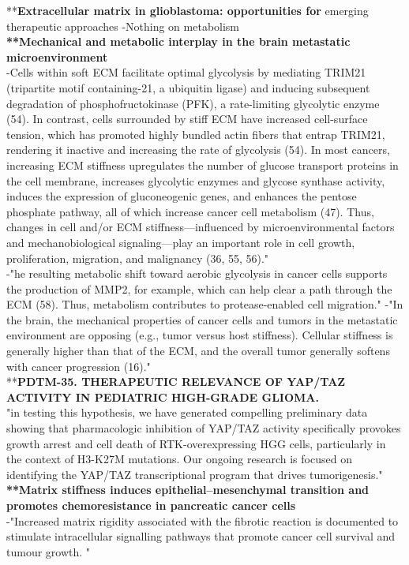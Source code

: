 \documentclass[11pt,a4paper]{article}
\begin{document}
**\textbf{Extracellular matrix in glioblastoma: opportunities for} emerging therapeutic approaches
-Nothing on metabolism\\


\textbf{
**Mechanical and metabolic interplay in the brain metastatic microenvironment}\\

-Cells within soft ECM facilitate optimal glycolysis by mediating TRIM21 (tripartite motif containing-21, a ubiquitin ligase) and inducing subsequent degradation of phosphofructokinase (PFK), a rate-limiting glycolytic enzyme (54). In contrast, cells surrounded by stiff ECM have increased cell-surface tension, which has promoted highly bundled actin fibers that entrap TRIM21, rendering it inactive and increasing the rate of glycolysis (54). In most cancers, increasing ECM stiffness upregulates the number of glucose transport proteins in the cell membrane, increases glycolytic enzymes and glycose synthase activity, induces the expression of gluconeogenic genes, and enhances the pentose phosphate pathway, all of which increase cancer cell metabolism (47). Thus, changes in cell and/or ECM stiffness—influenced by microenvironmental factors and mechanobiological signaling—play an important role in cell growth, proliferation, migration, and malignancy (36, 55, 56)."\\


-"he resulting metabolic shift toward aerobic glycolysis in cancer cells supports the production of MMP2, for example, which can help clear a path through the ECM (58). Thus, metabolism contributes to protease-enabled cell migration."
-"In the brain, the mechanical properties of cancer cells and tumors in the metastatic environment are opposing (e.g., tumor versus host stiffness). Cellular stiffness is generally higher than that of the ECM, and the overall tumor generally softens with cancer progression (16)."\\

**\textbf{PDTM-35. THERAPEUTIC RELEVANCE OF YAP/TAZ ACTIVITY IN PEDIATRIC HIGH-GRADE GLIOMA.}\\

"in testing this hypothesis, we have generated compelling preliminary data showing that pharmacologic inhibition of YAP/TAZ activity specifically provokes growth arrest and cell death of RTK-overexpressing HGG cells, particularly in the context of H3-K27M mutations. Our ongoing research is focused on identifying the YAP/TAZ transcriptional program that drives tumorigenesis."\\

\textbf{**Matrix stiffness induces epithelial–mesenchymal transition and promotes chemoresistance in pancreatic cancer cells}
\\

-"Increased matrix rigidity associated with the fibrotic reaction is documented to stimulate intracellular signalling pathways that promote cancer cell survival and tumour growth. "\\
\end{document}
